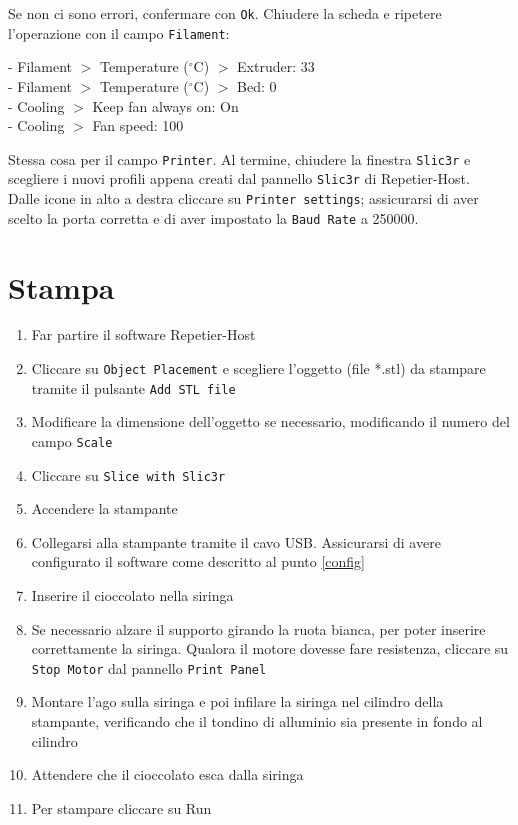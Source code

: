 \documentclass[12pt]{article}
\begin{document}
		Se non ci sono errori, confermare con \texttt{Ok}. Chiudere la scheda e ripetere l'operazione con il campo \texttt{Filament}:

		- Filament $>$ Temperature ($^{\circ}$C) $>$ Extruder: 33\\
		- Filament $>$ Temperature ($^{\circ}$C) $>$ Bed: 0\\
		- Cooling $>$ Keep fan always on: On\\
		- Cooling $>$ Fan speed: 100
		
		Stessa cosa per il campo \texttt{Printer}. Al termine, chiudere la finestra \texttt{Slic3r} e scegliere i nuovi profili appena creati dal pannello \texttt{Slic3r} di Repetier-Host.\\
		
		Dalle icone in alto a destra cliccare su \texttt{Printer settings}; assicurarsi di aver scelto la porta corretta e di aver impostato la \texttt{Baud Rate} a 250000.


\section{Stampa}

	\begin{enumerate}
		\item Far partire il software Repetier-Host
	
		\item Cliccare su \texttt{Object Placement} e scegliere l'oggetto (file *.stl) da stampare tramite il pulsante \texttt{Add STL file}
	
		\item Modificare la dimensione dell'oggetto se necessario, modificando il numero del campo \texttt{Scale}

		\item Cliccare su \texttt{Slice with Slic3r}

		\item Accendere la stampante

		\item Collegarsi alla stampante tramite il cavo USB. Assicurarsi di avere configurato il software come descritto al punto \ref{config}

		\item Inserire il cioccolato nella siringa
		
		\item Se necessario alzare il supporto girando la ruota bianca, per poter inserire correttamente la siringa. Qualora il motore dovesse fare resistenza, cliccare su \texttt{Stop Motor} dal pannello \texttt{Print Panel}

		\item Montare l'ago sulla siringa e poi infilare la siringa nel cilindro della stampante, verificando che il tondino di alluminio sia presente in fondo al cilindro

		\item Attendere che il cioccolato esca dalla siringa

		\item Per stampare cliccare su Run
	\end{enumerate}
\end{document}
